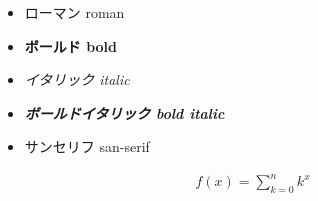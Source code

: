 \documentclass{ltjsarticle}
\begin{document}
\begin{itemize}
	\item \textrm{ローマン roman}
	\item \textbf{ボールド bold}
	\item \textit{イタリック italic}
	\item \textbf{\textit{ボールドイタリック bold italic}}
	\item \textsf{サンセリフ san-serif}
\end{itemize}

\begin{align}
	f(x) = \sum_{k=0}^{n} k^{x}
\end{align}
\end{document}
